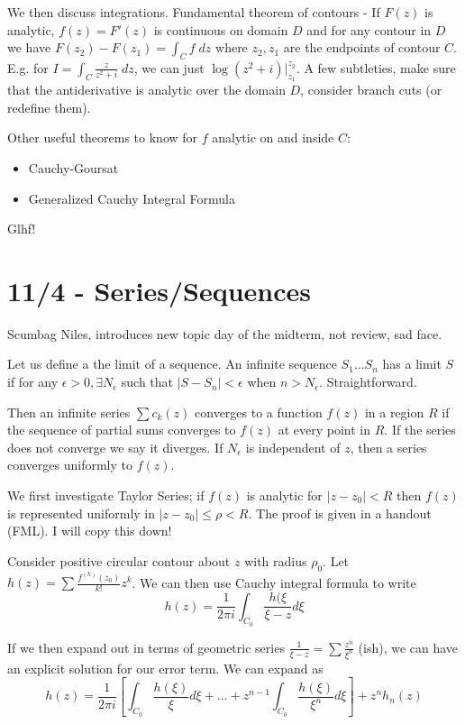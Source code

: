 \documentclass[10pt]{report}
\newcommand{\abs}[1]{\left|#1\right|}
\begin{document}
We then discuss integrations. Fundamental theorem of contours - If $F(z)$ is analytic, $f(z) = F'(z)$ is continuous on domain $D$ and for any contour in $D$ we have $F(z_2) - F(z_1) = \int_C f \; dz$ where $z_2, z_1$ are the endpoints of contour $C$. E.g. for $I = \int_C \frac{z}{z^2 + i}\; dz$, we can just $\log(z^2 + i)\Big|_{z_1}^{z_2}$. A few subtleties, make sure that the antiderivative is analytic over the domain $D$, consider branch cuts (or redefine them). 

Other useful theorems to know for $f$ analytic on and inside $C$:
\begin{itemize}
	\item Cauchy-Goursat
	\item Generalized Cauchy Integral Formula
\end{itemize}

Glhf!

\chapter{11/4 - Series/Sequences}

Scumbag Niles, introduces new topic day of the midterm, not review, sad face.

Let us define a the limit of a sequence. An infinite sequence $S_1\dots S_n$ has a limit $S$ if for any $\epsilon > 0, \exists N_\epsilon$ such that $\abs{S-S_n} < \epsilon$ when $n > N_\epsilon$. Straightforward.

Then an infinite series $\sum c_k(z)$ converges to a function $f(z)$ in a region $R$ if the sequence of partial sums converges to $f(z)$ at every point in $R$.  If the series does not converge we say it diverges. If $N_\epsilon$ is independent of $z$, then a series converges uniformly to $f(z)$. 

We first investigate Taylor Series; if $f(z)$ is analytic for $\abs{z-z_0} < R$ then $f(z)$ is represented uniformly in $\abs{z-z_0} \leq \rho < R$. The proof is given in a handout (FML). I will copy this down!

Consider positive circular contour about $z$ with radius $\rho_0$. Let $h(z) = \sum \frac{f^{(k)}(z_0)}{k!}z^k$. We can then use Cauchy integral formula to write
$$h(z) = \frac{1}{2\pi i}\int_{C_0} \frac{h(\xi}{\xi - z} d\xi$$

If we then expand out in terms of geometric series $\frac{1}{\xi - z} = \sum \frac{z^n}{\xi^n}$ (ish), we can have an explicit solution for our error term. We can expand as 
$$h(z) = \frac{1}{2\pi i}\left[ \int_{C_0} \frac{h(\xi)}{\xi}d\xi + \dots + z^{n-1} \int_{C_0} \frac{h(\xi)}{\xi^n}d\xi \right] + z^n h_n(z)$$
\end{document}
